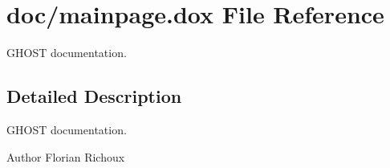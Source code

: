 \hypertarget{mainpage_8dox}{\section{doc/mainpage.dox File Reference}
\label{mainpage_8dox}
}


G\-H\-O\-S\-T documentation.  




\subsection{Detailed Description}
G\-H\-O\-S\-T documentation. \begin{DoxyAuthor}{Author}
Florian Richoux 
\end{DoxyAuthor}
